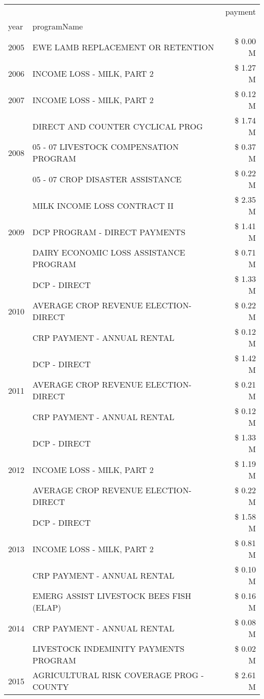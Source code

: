 \begin{tabular}{llr}
\toprule
 &  & payment \\
year & programName &  \\
\midrule
2005 & EWE LAMB REPLACEMENT OR RETENTION & \$ 0.00 M \\
\cline{1-3}
2006 & INCOME LOSS - MILK, PART 2 & \$ 1.27 M \\
\cline{1-3}
2007 & INCOME LOSS - MILK, PART 2 & \$ 0.12 M \\
\cline{1-3}
\multirow[t]{3}{*}{2008} & DIRECT AND COUNTER CYCLICAL PROG & \$ 1.74 M \\
 & 05 - 07 LIVESTOCK COMPENSATION PROGRAM & \$ 0.37 M \\
 & 05 - 07 CROP DISASTER ASSISTANCE & \$ 0.22 M \\
\cline{1-3}
\multirow[t]{3}{*}{2009} & MILK INCOME LOSS CONTRACT II & \$ 2.35 M \\
 & DCP PROGRAM - DIRECT PAYMENTS & \$ 1.41 M \\
 & DAIRY ECONOMIC LOSS ASSISTANCE PROGRAM & \$ 0.71 M \\
\cline{1-3}
\multirow[t]{3}{*}{2010} & DCP - DIRECT & \$ 1.33 M \\
 & AVERAGE CROP REVENUE ELECTION-DIRECT & \$ 0.22 M \\
 & CRP PAYMENT - ANNUAL RENTAL & \$ 0.12 M \\
\cline{1-3}
\multirow[t]{3}{*}{2011} & DCP - DIRECT & \$ 1.42 M \\
 & AVERAGE CROP REVENUE ELECTION-DIRECT & \$ 0.21 M \\
 & CRP PAYMENT - ANNUAL RENTAL & \$ 0.12 M \\
\cline{1-3}
\multirow[t]{3}{*}{2012} & DCP - DIRECT & \$ 1.33 M \\
 & INCOME LOSS - MILK, PART 2 & \$ 1.19 M \\
 & AVERAGE CROP REVENUE ELECTION-DIRECT & \$ 0.22 M \\
\cline{1-3}
\multirow[t]{3}{*}{2013} & DCP - DIRECT & \$ 1.58 M \\
 & INCOME LOSS - MILK, PART 2 & \$ 0.81 M \\
 & CRP PAYMENT - ANNUAL RENTAL & \$ 0.10 M \\
\cline{1-3}
\multirow[t]{3}{*}{2014} & EMERG ASSIST LIVESTOCK BEES FISH (ELAP) & \$ 0.16 M \\
 & CRP PAYMENT - ANNUAL RENTAL & \$ 0.08 M \\
 & LIVESTOCK INDEMINITY PAYMENTS PROGRAM & \$ 0.02 M \\
\cline{1-3}
\multirow[t]{3}{*}{2015} & AGRICULTURAL RISK COVERAGE PROG - COUNTY & \$ 2.61 M \\

\end{tabular}

